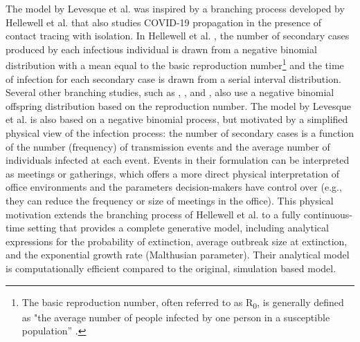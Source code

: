 \documentclass[sr]{drdc-report}
\begin{document}

 

The model by Levesque et al. was inspired by a branching process developed by Hellewell et al. \cite{Hellewell} that also studies COVID-19 propagation in the presence of contact tracing with isolation. In Hellewell et al. \cite{Hellewell}, the number of secondary cases produced by each infectious individual is drawn from a negative binomial distribution with a mean equal to the basic reproduction number{\footnote{The basic reproduction number, often referred to as R\textsubscript{0}, is generally defined as "the average number of people infected by one person in a susceptible population” \cite{WHO_slides}.}} and the time of infection for each secondary case is drawn from a serial interval{\footnotemark} distribution. Several other branching studies, such as \cite{Boldog}, \cite{Kucharski}, \cite{Pearson} and \cite{Endo}, also use a negative binomial offspring distribution based on the reproduction number. The model by Levesque et al. is also based on a negative binomial process, but motivated by a simplified physical view of the infection process: the number of secondary cases is a function of the number (frequency) of transmission events and the average number of individuals infected at each event. Events in their formulation can be interpreted as meetings or gatherings, which offers a more direct physical interpretation of office environments and the parameters decision-makers have control over (e.g., they can reduce the frequency or size of meetings in the office). This physical motivation extends the branching process of Hellewell et al. to a fully continuous-time setting that provides a complete generative model, including analytical expressions for the probability of extinction, average outbreak size at extinction, and the exponential growth rate (Malthusian parameter). Their analytical model is computationally efficient compared to the original, simulation based model.  


\end{document}
